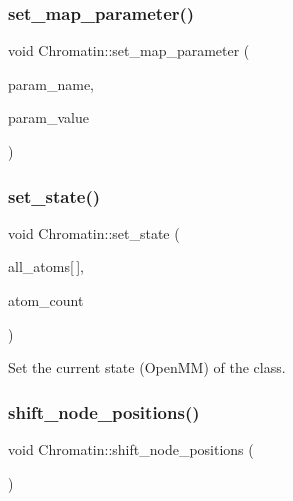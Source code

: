 \subsubsection{\texorpdfstring{set\_map\_parameter()}{set\_map\_parameter()}}
{\footnotesize\ttfamily void Chromatin\+::set\+\_\+map\+\_\+parameter (\begin{DoxyParamCaption}\item[{string}]{param\+\_\+name,  }\item[{double}]{param\+\_\+value }\end{DoxyParamCaption})}

\mbox{\label{classChromatin_a68ec2e0928d09f0b3c461a68f2865cb8}} 
\subsubsection{\texorpdfstring{set\_state()}{set\_state()}}
{\footnotesize\ttfamily void Chromatin\+::set\+\_\+state (\begin{DoxyParamCaption}\item[{\mbox{\hyperlink{structMyAtomInfo}{My\+Atom\+Info}}}]{all\+\_\+atoms\mbox{[}$\,$\mbox{]},  }\item[{int}]{atom\+\_\+count }\end{DoxyParamCaption})}

Set the current state (Open\+MM) of the class. \mbox{\label{classChromatin_a1eb54e982903441e3b917da97bf1cf0b}} 
\subsubsection{\texorpdfstring{shift\_node\_positions()}{shift\_node\_positions()}}
{\footnotesize\ttfamily void Chromatin\+::shift\+\_\+node\+\_\+positions (\begin{DoxyParamCaption}\item[{void}]{ }\end{DoxyParamCaption})\hspace{0.3cm}{\ttfamily [inline]}}

\mbox{\label{classChromatin_a701278cbb0c1014ae62f479e2a9f6737}} 
